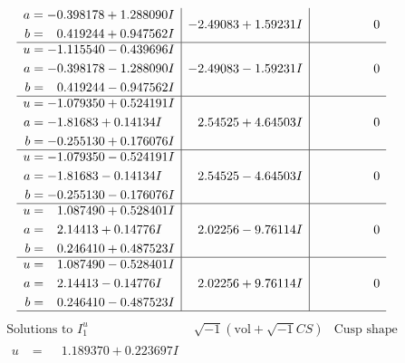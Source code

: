 \documentclass[1p]{elsarticle_modified}
\theoremstyle{definition}
\newcommand{\I}{\sqrt{-1}}
\begin{document}
$$\begin{array}{c|c|c}
\begin{aligned}
a &= -0.398178 + 1.288090 I \\
b &= \phantom{-}0.419244 + 0.947562 I\end{aligned}
 & -2.49083 + 1.59231 I & \phantom{-0.000000 } 0 \\ \hline\begin{aligned}
u &= -1.115540 - 0.439696 I \\
a &= -0.398178 - 1.288090 I \\
b &= \phantom{-}0.419244 - 0.947562 I\end{aligned}
 & -2.49083 - 1.59231 I & \phantom{-0.000000 } 0 \\ \hline\begin{aligned}
u &= -1.079350 + 0.524191 I \\
a &= -1.81683 + 0.14134 I \\
b &= -0.255130 + 0.176076 I\end{aligned}
 & \phantom{-}2.54525 + 4.64503 I & \phantom{-0.000000 } 0 \\ \hline\begin{aligned}
u &= -1.079350 - 0.524191 I \\
a &= -1.81683 - 0.14134 I \\
b &= -0.255130 - 0.176076 I\end{aligned}
 & \phantom{-}2.54525 - 4.64503 I & \phantom{-0.000000 } 0 \\ \hline\begin{aligned}
u &= \phantom{-}1.087490 + 0.528401 I \\
a &= \phantom{-}2.14413 + 0.14776 I \\
b &= \phantom{-}0.246410 + 0.487523 I\end{aligned}
 & \phantom{-}2.02256 - 9.76114 I & \phantom{-0.000000 } 0 \\ \hline\begin{aligned}
u &= \phantom{-}1.087490 - 0.528401 I \\
a &= \phantom{-}2.14413 - 0.14776 I \\
b &= \phantom{-}0.246410 - 0.487523 I\end{aligned}
 & \phantom{-}2.02256 + 9.76114 I & \phantom{-0.000000 } 0\\
 \hline 
 \end{array}$$\newpage$$\begin{array}{c|c|c}  
\text{Solutions to }I^u_{1}& \I (\text{vol} + \sqrt{-1}CS) & \text{Cusp shape}\\
 \hline 
\begin{aligned}
u &= \phantom{-}1.189370 + 0.223697 I \\

\end{aligned}
\end{array}$$
\end{document}
